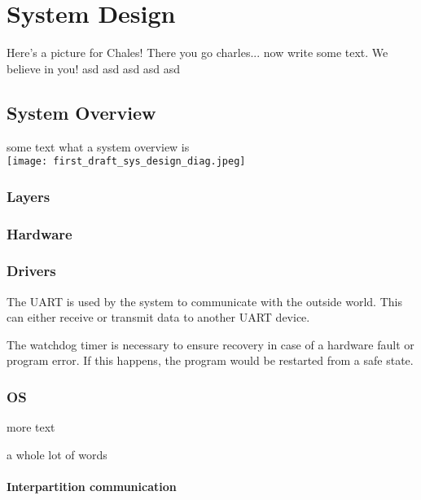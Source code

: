 \chapter{System Design}

Here's a picture for Chales!
There you go charles... now write some text. We believe in you!
asd
asd
asd
asd
asd

\section{System Overview}
some text what a system overview is \\
\texttt{[image: first\_draft\_sys\_design\_diag.jpeg]}

\subsection{Layers}


\subsection{Hardware}

\subsection{Drivers}
\begin{description}[align=left]
	\item [\textbf{UART driver}] The UART is used by the system to communicate with the outside
	world. This can either receive or transmit data to another UART device.
	\item [\textbf{Watchdog timer driver}] The watchdog timer is necessary to ensure recovery
	in case of a hardware fault or program error. If this happens, the program would be restarted
	from a safe state. 
	
\end{description}

\subsection{OS}
\begin{description}[align=left]
	\item [\textbf{scheduler}] more text
	\item [\textbf{scheduler}] a whole lot of words
\end{description}
\subsubsection{Interpartition communication}

